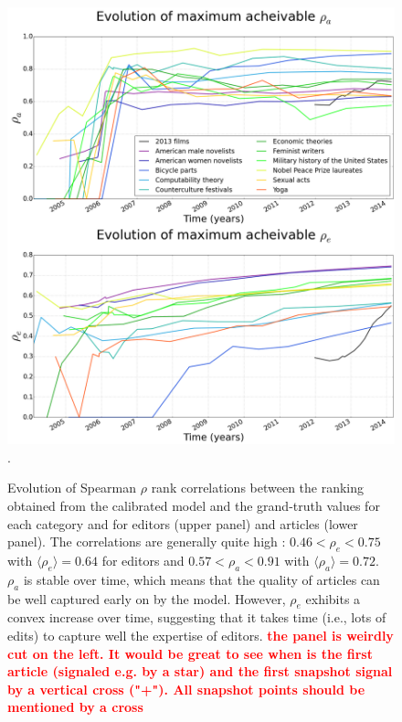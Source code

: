 \begin{figure}[!t]
\centering
\includegraphics[width=0.9\columnwidth]{../Figures/rho_combined.png}.
\caption{Evolution of Spearman $\rho$ rank correlations between the ranking obtained from the calibrated model and the grand-truth values for each category and for editors (upper panel)  and articles (lower panel). The correlations are generally quite high : $ 0.46 < \rho_e < 0.75$ with $\langle \rho_e\rangle = 0.64$ for editors and $0.57 < \rho_a < 0.91$ with $\langle \rho_a\rangle = 0.72$. $\rho_{a}$  is stable over time, which means that the quality of articles can be well captured early on by the model. However, $\rho_e$ exhibits a convex increase over time, suggesting that it takes time (i.e., lots of edits) to capture well the expertise of editors. \textcolor{red}{\bf the panel is weirdly cut on the left. It would be great to see when is the first article (signaled e.g. by a star) and the first snapshot signal by a vertical cross ("+"). All snapshot points should be mentioned by a cross}}
\label{fig:rhotime}
\end{figure}

	



